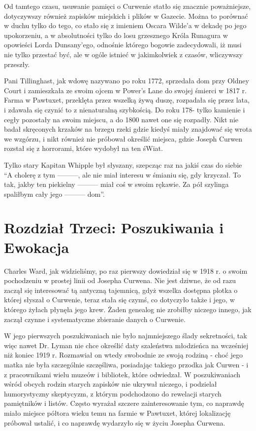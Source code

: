 Od tamtego czasu, usuwanie pamięci o Curwenie statło się znacznie poważniejsze, dotyczywszy również zapisków miejskich i plików w Gazecie. Można to porównać w duchu tylko do tego, co stało się z imieniem Oscara Wilde'a w dekadę po jego upokorzeniu, a w absolutności tylko do losu grzesznego Króla Runagura w opowieści Lorda Dunsany'ego, odnośnie którego bogowie zadecydowali, iż musi nie tylko przestać być, ale w ogóle istnieć w jakimkolwiek z czasów, wliczywszy przeszły. 

Pani Tillinghast, jak wdowę nazywano po roku 1772, sprzedała dom przy Oldney Court i zamieszkała ze swoim ojcem w Power's Lane do swojej śmierci w 1817 r. Farma w Pawtuxet, przeklęta przez wszelką żywą duszę, rozpadała się przez lata, i zdawała się czynić to z nienaturalną szybkością. Do roku 178- tylko kamienie i cegły pozostały na swoim miejscu, a do 1800 nawet one się rozpadły. Nikt nie badał skręconych krzaków na brzegu rzeki gdzie kiedyś miały znajdować się wrota we wzgórzu, i nikt również nie próbował określić miejsca, gdzie Joseph Curwen rozstał się z horrorami, które wydobył na ten śWiat.

Tylko stary Kapitan Whipple był słyszany, szepcząc raz na jakiś czas do siebie ``A cholerę z tym ———, ale nie miał interesu w śmianiu się, gdy krzyczał. To tak, jakby ten piekielny ——— miał coś w swoim rękawie. Za pół szylinga spaliłbym cały jego ——— dom''.

\section{Rozdział Trzeci: Poszukiwania i Ewokacja}

Charles Ward, jak widzieliśmy, po raz pierwszy dowiedział się w 1918 r. o swoim pochodzeniu w prostej linii od Josepha Curwena. Nie jest dziwne, że od razu zaczął się interesować tą antyczną tajemnicą, gdyż wszelka dostępna plotka o której słyszał o Curwenie, teraz stała się czymś, co dotyczyło także i jego, w którego żyłach płynęła jego krew. Żaden genealog  nie zrobiłby niczego innego, jak zaczął czynne i systematyczne zbieranie danych o Curwenie. 

W jego pierwszych poszukiwaniach nie było najmniejszego ślady sekretności, tak więc nawet Dr. Lyman nie chce określić daty szaleństwa młodzieńca na wcześniej niż koniec 1919 r. Rozmawiał on wtedy swobodnie ze swoją rodziną - choć jego matka nie była szczególnie szczęśliwa, posiadając takiego przodka jak Curwen - i z pracownikami wielu muzeów i bibliotek, które odwiedzał. W poszukiwaniach wśród obcych rodzin starych zapisków nie ukrywał niczego, i podzielał humorystyczny skeptycyzm, z którym podchodzono do rewelacji starych pamiętników i listów. Często wyrażał szczere zainteresowanie tym, co naprawdę miało miejsce półtora wieku temu na farmie w Pawtuxet, której lokalizację próbował ustalić, i co naprawdę wydarzyło się w życiu Josepha Curwena.  

